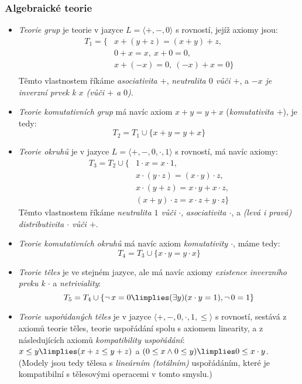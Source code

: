 \subsubsection{Algebraické teorie}

\begin{itemize}
    \item \emph{Teorie grup} je teorie v jazyce $L=\langle +,-,0\rangle$ s rovností, jejíž axiomy jsou:
    \begin{align*}
        T_1=\{& x + (y + z) = (x + y) + z,\\
            & 0 + x = x,\ x + 0 = 0,\\
            & x + (-x) = 0,\ (-x) + x = 0\}\\
    \end{align*}
    Těmto vlastnostem říkáme \emph{asociativita $+$}, \emph{neutralita $0$ vůči $+$}, a \emph{$-x$ je inverzní prvek k $x$ (vůči $+$ a $0$)}.
    \item \emph{Teorie komutativních grup} má navíc axiom $x+y=y+x$ (\emph{komutativita $+$}), je tedy: 
    $$
    T_2=T_1\cup\{x+y=y+x\}
    $$
    \item \emph{Teorie okruhů} je v jazyce $L=\langle +,-,0,\cdot,1\rangle$ s rovností, má navíc axiomy:
    \begin{align*}
        T_3=T_2\cup\{   & 1 \cdot x = x \cdot 1,\\
        & x \cdot (y \cdot z) = (x \cdot y) \cdot z,\\
        & x \cdot (y + z) = x \cdot y + x \cdot z,\\
        & (x + y) \cdot z = x \cdot z + y \cdot z\}
    \end{align*}
    Těmto vlastnostem říkáme \emph{neutralita $1$ vůči $\cdot$}, \emph{asociativita $\cdot$}, a \emph{(levá i pravá) distributivita $\cdot$ vůči $+$}.
    \item \emph{Teorie komutativních okruhů} má navíc axiom \emph{komutativity $\cdot$}, máme tedy:
    $$
    T_4 = T_3 \cup \{x \cdot y = y \cdot x\}
    $$
    \item \emph{Teorie těles} je ve stejném jazyce, ale má navíc axiomy \emph{existence inverzního prvku k $\cdot$} a \emph{netriviality}:
    $$
    T_5 = T_4 \cup \{\neg\,x=0 \limplies (\exists y)(x\cdot y = 1), \neg\,0=1\}
    $$
    \item \emph{Teorie uspořádaných těles} je v jazyce $\langle +, -, 0,\cdot,1,\leq\rangle$ s rovností, sestává z axiomů teorie těles, teorie uspořádání spolu s axiomem linearity, a z následujících axiomů \emph{kompatibility uspořádání}: $x\leq y\limplies (x+z\leq y+z)$ a $(0\leq x\land 0\leq y)\limplies 0\leq x\cdot y$. (Modely jsou tedy tělesa s \emph{lineárním (totálním)} uspořádáním, které je kompatibilní s tělesovými operacemi v tomto smyslu.)
\end{itemize}


